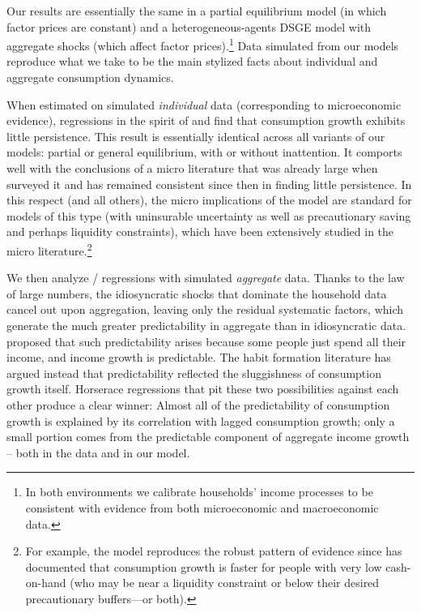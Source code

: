 \documentclass[titlepage]{\econtex}\newcommand{\texname}{cAndCwithStickyE}
\begin{document}
Our results are essentially the same in a partial equilibrium model (in which factor prices are constant) and a heterogeneous-agents DSGE model with aggregate shocks (which affect factor prices).\footnote{In both environments we calibrate households' income processes to be consistent with evidence from both microeconomic and macroeconomic data.}  Data simulated from our models reproduce what we take to be the main stylized facts about individual and aggregate consumption dynamics.

When estimated on simulated \emph{individual} data (corresponding to microeconomic evidence), regressions in the spirit of \cite{hallRandomWalk} and \cite{cmModel} find that consumption growth exhibits little persistence.  This result is essentially identical across all variants of our models: partial or general equilibrium, with or without inattention. It comports well with the conclusions of a micro literature that was already large when \cite{deatonUnderstandingC} surveyed it and has remained consistent since then in finding little persistence.  In this respect (and all others), the micro implications of the model are standard for models of this type (with uninsurable uncertainty as well as precautionary saving and perhaps liquidity constraints), which have been extensively studied in the micro literature.\footnote{For example, the model reproduces the robust pattern of evidence since \cite{zeldes:jpe} has documented that consumption growth is faster for people with very low cash-on-hand (who may be near a liquidity constraint or below their desired precautionary buffers---or both).}

We then analyze \cite{hallRandomWalk}/\cite{cmModel} regressions with simulated \emph{aggregate} data. Thanks to the law of large numbers, the idiosyncratic shocks that dominate the household data cancel out upon aggregation, leaving only the residual systematic factors, which generate the much greater predictability in aggregate than in idiosyncratic data.  \cite{cmModel} proposed that such predictability arises because some people just spend all their income, and income growth is predictable.  The habit formation literature has argued instead that predictability reflected the sluggishness of consumption growth itself.  Horserace regressions that pit these two possibilities against each other produce a clear winner: Almost all of the predictability of consumption growth is explained by its correlation with lagged consumption growth; only a small portion comes from the predictable component of aggregate income growth -- both in the data and in our model.
\end{document}
